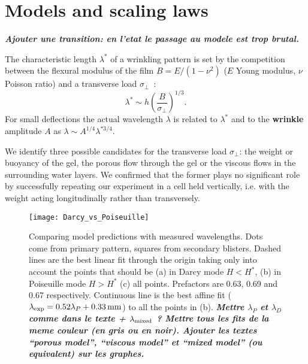 \documentclass[twocolumn,superscriptaddress,showpacs,preprintnumbers,
amsmath,amssymb,prl]{revtex4-1}
\newcommand{\seb}[1]{\textbf{\color{blue}#1}} %
\begin{document}
\section*{Models and scaling laws}

\seb{\it Ajouter une transition: en l'etat le passage au modele est trop brutal.}

The characteristic length $\lambda^*$ of a wrinkling pattern is set by the competition between the flexural modulus of the film $B=E/(1-\nu^2)$ ($E$ Young modulus, $\nu$ Poisson ratio) and a transverse load $\sigma_\perp$~\cite{Vella2009,Kolinski2009}: 
\begin{equation}
\lambda^* \sim h \left(\frac{B}{\sigma_\perp}\right)^{1/3}.
\label{eq:lstar}
\end{equation}
For small deflections the actual wavelength $\lambda$ is related to $\lambda^*$ and to the \seb{wrinkle} amplitude $A$ as $\lambda \sim A^{1/4} \lambda^{*3/4}$.

We identify three possible candidates for the transverse load $\sigma_\perp$: the weight or buoyancy of the gel, the porous flow through the gel or the viscous flows in the surrounding water layers. We confirmed that the former plays no significant role by successfully repeating our experiment in a cell held vertically, i.e. with the weight acting longitudinally rather than transversely.

\begin{figure*}
	\texttt{[image: Darcy\_vs\_Poiseuille]}
	\caption{Comparing model predictions with measured wavelengths. Dots come from primary pattern, squares from secondary blisters. Dashed lines are the best linear fit through the origin taking only into account the points that should be (a) in Darcy mode $H<H^*$, (b) in Poiseuille mode $H>H^*$ (c) all points. Prefactors are 0.63, 0.69 and 0.67 respectively. Continuous line is the best affine fit ($\lambda_{\rm exp}=0.52\lambda_{P}+\SI{0.33}{\milli\metre}$) to all the points in (b). \seb{\it Mettre $\lambda_P$ et $\lambda_D$ comme dans le texte + $\lambda_{\rm mixed}$ ? Mettre tous les fits de la meme couleur (en gris ou en noir). Ajouter les textes ``porous model'', ``viscous model'' et ``mixed model'' (ou equivalent) sur les graphes.}}
	\label{fig:DarcyPoiseuille}
\end{figure*}
\end{document}
